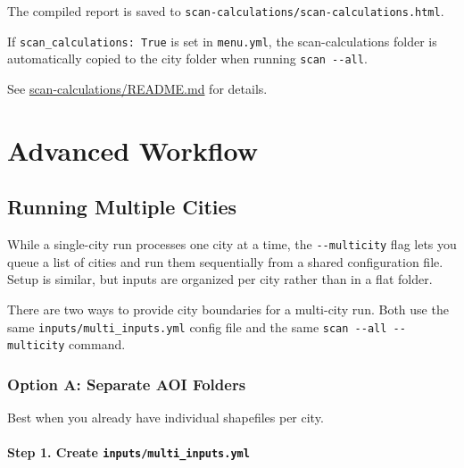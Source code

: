 \documentclass[
  letterpaper,
  DIV=11,
  numbers=noendperiod]{scrreprt}
\begin{document}
The compiled report is saved to
\texttt{scan-calculations/scan-calculations.html}.

\begin{tcolorbox}[enhanced jigsaw, arc=.35mm, bottomrule=.15mm, bottomtitle=1mm, breakable, colback=white, colbacktitle=quarto-callout-note-color!10!white, colframe=quarto-callout-note-color-frame, coltitle=black, left=2mm, leftrule=.75mm, opacityback=0, opacitybacktitle=0.6, rightrule=.15mm, title=\textcolor{quarto-callout-note-color}{\faInfo}\hspace{0.5em}{Note}, titlerule=0mm, toprule=.15mm, toptitle=1mm]

If \texttt{scan\_calculations:\ True} is set in \texttt{menu.yml}, the
scan-calculations folder is automatically copied to the city folder when
running \texttt{scan\ -\/-all}.

See
\href{../../scan-calculations/README.md}{scan-calculations/README.md}
for details.

\end{tcolorbox}

\part{Advanced Workflow}

\chapter{Running Multiple Cities}\label{running-multiple-cities}

While a single-city run processes one city at a time, the
\texttt{-\/-multicity} flag lets you queue a list of cities and run them
sequentially from a shared configuration file. Setup is similar, but
inputs are organized per city rather than in a flat folder.

There are two ways to provide city boundaries for a multi-city run. Both
use the same \texttt{inputs/multi\_inputs.yml} config file and the same
\texttt{scan\ -\/-all\ -\/-multicity} command.

\section{Option A: Separate AOI
Folders}\label{option-a-separate-aoi-folders}

Best when you already have individual shapefiles per city.

\subsection{\texorpdfstring{Step 1. Create
\texttt{inputs/multi\_inputs.yml}}{Step 1. Create inputs/multi\_inputs.yml}}\label{step-1.-create-inputsmulti_inputs.yml}
\end{document}
